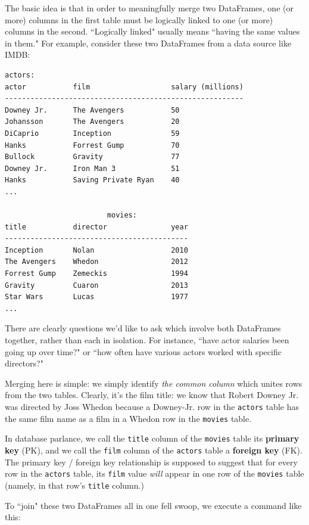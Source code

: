 \documentclass[12pt]{article}
\begin{document}
The basic idea is that in order to meaningfully merge two DataFrames, one (or
more) columns in the first table must be logically linked to one (or more)
columns in the second. ``Logically linked" usually means ``having the same
values in them." For example, consider these two DataFrames from a data source
like IMDB:

\pagebreak
\begin{Verbatim}[fontsize=small,samepage=true,frame=none]
                        actors:
actor           film                   salary (millions)
--------------------------------------------------------
Downey Jr.      The Avengers           50
Johansson       The Avengers           20
DiCaprio        Inception              59
Hanks           Forrest Gump           70
Bullock         Gravity                77
Downey Jr.      Iron Man 3             51
Hanks           Saving Private Ryan    40
...

                        movies:
title           director               year
-------------------------------------------
Inception       Nolan                  2010
The Avengers    Whedon                 2012
Forrest Gump    Zemeckis               1994
Gravity         Cuaron                 2013
Star Wars       Lucas                  1977
...
\end{Verbatim}
\normalsize
 
There are clearly questions we'd like to ask which involve both DataFrames
together, rather than each in isolation. For instance, ``have actor salaries
been going up over time?" or ``how often have various actors worked with
specific directors?"

Merging here is simple: we simply identify \textit{the common column} which
unites rows from the two tables. Clearly, it's the film title: we know that
Robert Downey Jr. was directed by Joss Whedon because a Downey-Jr. row in the
\texttt{actors} table has the same film name as a film in a Whedon row in the
\texttt{movies} table.

In database parlance, we call the \texttt{title} column of the \texttt{movies}
table its \textbf{primary key} (PK), and we call the \texttt{film} column of
the \texttt{actors} table a \textbf{foreign key} (FK). The primary key /
foreign key relationship is supposed to suggest that for every row in the
\texttt{actors} table, its \texttt{film} value \textit{will} appear in one row
of the \texttt{movies} table (namely, in that row's \texttt{title} column.)

To ``join" these two DataFrames all in one fell swoop, we execute a command
like this:
\end{document}
